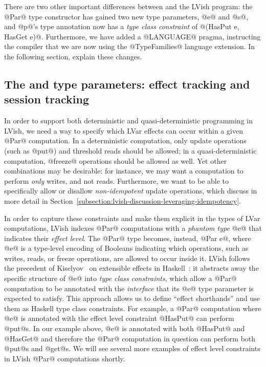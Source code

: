 There are two other important differences between  and the LVish
program: the @Par@ type constructor has gained two new type
parameters, @e@ and @s@, and @p@'s type annotation now has a
\emph{type class constraint} of @(HasPut e, HasGet e)@.  Furthermore,
we have added a @LANGUAGE@ pragma, instructing the compiler that we
are now using the @TypeFamilies@ language extension.  In the following
section,  explain these changes.

\subsection{The  and  type parameters: effect tracking and session tracking}

In order to support both deterministic and quasi-deterministic
programming in LVish, we need a way to specify which LVar effects can
occur within a given @Par@ computation.  In a deterministic
computation, only update operations (such as @put@) and threshold
reads should be allowed; in a quasi-deterministic computation,
@freeze@ operations should be allowed as well.  Yet other combinations
may be desirable: for instance, we may want a computation to perform
\emph{only} writes, and not reads.
\ifdefined\DISSERTATION
Furthermore, we want to be able to
specifically allow or disallow \emph{non-idempotent} update
operations, which  discuss in more detail in
Section~\ref{subsection:lvish-discussion-leveraging-idempotency}.
\fi

In order to capture these constraints and make them explicit in the
types of LVar computations, LVish indexes @Par@ computations with a
\emph{phantom type} @e@ that indicates their \emph{effect level}.  The
@Par@ type becomes, instead, @Par e@, where @e@ is a type-level
encoding of Booleans indicating which operations, such as writes,
reads, or freeze operations, are allowed to occur inside it.  LVish
follows the precedent of Kiselyov \etal~on extensible effects in
Haskell~\cite{oleg-amr-haskell-2013}: it abstracts away the specific
structure of @e@ into \emph{type class constraints}, which allow a
@Par@ computation to be annotated with the \emph{interface} that its
@e@ type parameter is expected to satisfy.  This approach allows us to
define ``effect shorthands'' and use them as Haskell type class
constraints.  For example, a @Par@ computation where @e@ is annotated
with the effect level constraint @HasPut@ can perform @put@s.  In our
example above, @e@ is annotated with both @HasPut@ and @HasGet@ and
therefore the @Par@ computation in question can perform both @put@s
and @get@s.  We will see several more examples of effect level
constraints in LVish @Par@ computations shortly.

